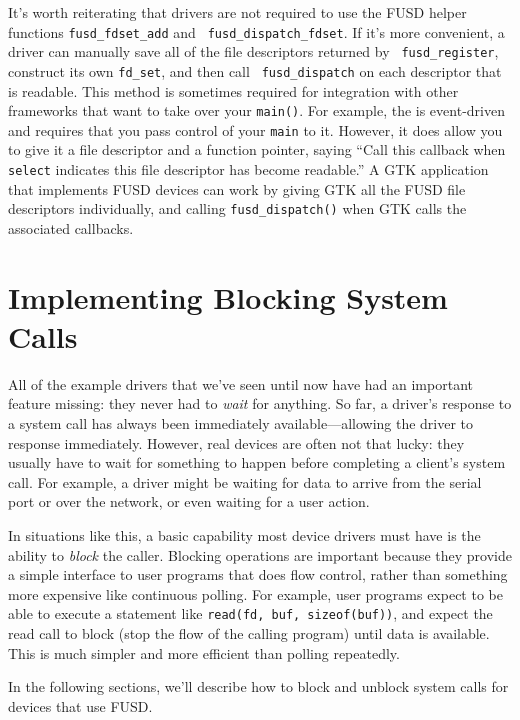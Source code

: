 \documentclass{article}
\begin{document}
It's worth reiterating that drivers are not required to use the FUSD
helper functions {\tt fusd\_fdset\_add} and {\tt
fusd\_dispatch\_fdset}.  If it's more convenient, a driver can
manually save all of the file descriptors returned by {\tt
fusd\_register}, construct its own {\tt fd\_set}, and then call {\tt
fusd\_dispatch} on each descriptor that is readable.  This method is
sometimes required for integration with other frameworks that want to
take over your {\tt main()}.  For example, the 
 is event-driven and requires that you
pass control of your {\tt main} to it.  However, it does allow you to
give it a file descriptor and a function pointer, saying ``Call this
callback when {\tt select} indicates this file descriptor has become
readable.''  A GTK application that implements FUSD devices can work
by giving GTK all the FUSD file descriptors individually, and calling
{\tt fusd\_dispatch()} when GTK calls the associated callbacks.



\section{Implementing Blocking System Calls}

All of the example drivers that we've seen until now have had an
important feature missing: they never had to {\em wait} for anything.
So far, a driver's response to a system call has always been
immediately available---allowing the driver to response immediately.
However, real devices are often not that lucky: they usually have to
wait for something to happen before completing a client's system call.
For example, a driver might be waiting for data to arrive from the
serial port or over the network, or even waiting for a user action.

In situations like this, a basic capability most device drivers must
have is the ability to {\em block} the caller.  Blocking operations
are important because they provide a simple interface to user programs
that does flow control, rather than something more expensive like
continuous polling.  For example, user programs expect to be able to
execute a statement like {\tt read(fd, buf, sizeof(buf))}, and expect
the read call to block (stop the flow of the calling program) until
data is available.  This is much simpler and more efficient than
polling repeatedly.

In the following sections, we'll describe how to block and unblock
system calls for devices that use FUSD.
\end{document}
